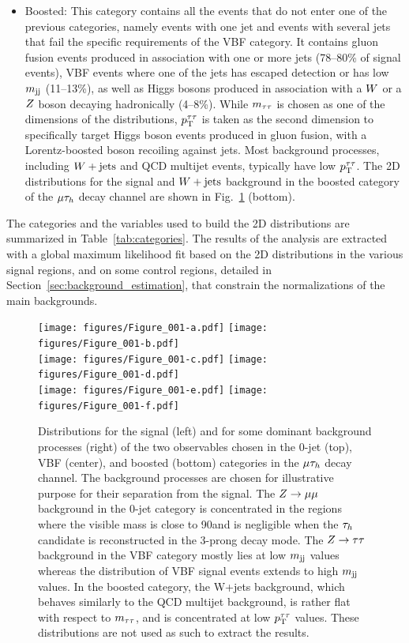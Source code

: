 \begin{itemize}
\item {Boosted}: This category contains all the events that do not
enter one of the previous categories, namely events with one jet and events with several jets that fail the specific requirements of the VBF category.
It contains gluon fusion events produced in association with one or more jets (78--80\% of signal events),
VBF events where one of the jets has escaped detection or has low $m_\mathrm{jj}$ (11--13\%), as well as
Higgs bosons produced in association with a $W$ or a $Z$ boson decaying hadronically (4--8\%).
While $m_{\tau\tau}$ is chosen as one of the dimensions of the distributions, $p_\mathrm{T}^{\tau\tau}$ is taken as the second dimension to specifically target Higgs boson events produced in gluon fusion,
with a Lorentz-boosted boson recoiling against jets. Most background processes, including $W+\text{jets}$ and QCD multijet events, typically have low $p_\mathrm{T}^{\tau\tau}$. The 2D
distributions for the signal and $W+\text{jets}$ background in the boosted category of the $\mu\tau_{h}$ decay channel are shown in Fig.~\ref{fig:2Dcategories} (bottom).
\end{itemize}

The categories and the variables used to build the 2D distributions are summarized in
Table~\ref{tab:categories}. The results of the analysis are extracted with a global maximum likelihood fit based on  the 2D distributions in the various signal regions, and on some control regions, detailed in Section~\ref{sec:background_estimation}, that constrain the normalizations of the main backgrounds.

\begin{figure}[htbp]
\centering
     \texttt{[image: figures/Figure\_001-a.pdf]}
     \texttt{[image: figures/Figure\_001-b.pdf]}\\
     \texttt{[image: figures/Figure\_001-c.pdf]}
     \texttt{[image: figures/Figure\_001-d.pdf]}\\
     \texttt{[image: figures/Figure\_001-e.pdf]}
     \texttt{[image: figures/Figure\_001-f.pdf]}
     \caption{Distributions for the signal (left) and for some dominant background processes (right) of the two observables chosen in the 0-jet (top), VBF (center), and boosted
(bottom) categories in the $\mu\tau_{h}$ decay channel. The background processes are chosen for illustrative purpose for their separation from the signal. The $Z\to\mu\mu$ background in the 0-jet category is concentrated in the regions where the visible mass is close to 90\GeV and is negligible when the $\tau_{h}$ candidate is reconstructed in the 3-prong decay mode. The $Z\to\tau\tau$ background in the VBF category mostly lies at low $m_\mathrm{jj}$ values whereas the distribution of VBF signal events extends to high $m_\mathrm{jj}$ values. In the boosted category, the W+jets background, which behaves similarly to the QCD multijet background, is rather flat with respect to $m_{\tau\tau}$, and is concentrated at low $p_\mathrm{T}^{\tau\tau}$ values. These distributions are not used as such to extract the results.}
     \label{fig:2Dcategories}
\end{figure}


